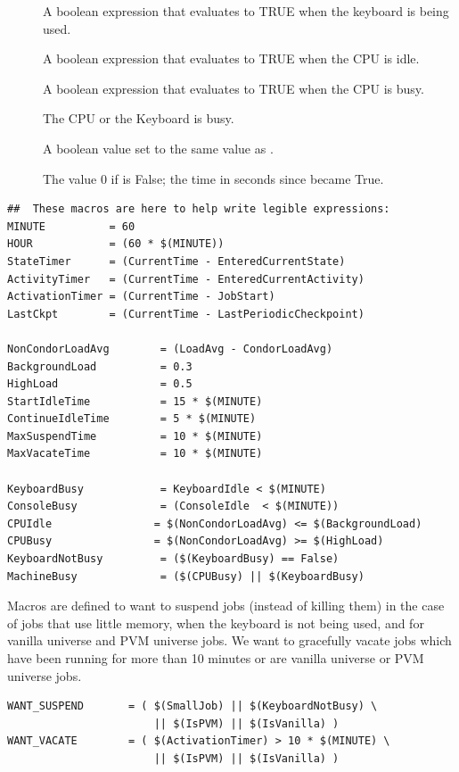 \begin{description}
\item[] A boolean expression that evaluates to TRUE
    when the keyboard is being used.

\item[] A boolean expression that evaluates to TRUE
    when the CPU is idle.

\item[] A boolean expression that evaluates
    to TRUE when the CPU is busy.

\item[] The CPU or the Keyboard is busy.

\item[] A boolean value set to the same value as 
    .

\item[] The value 0 if 
    is False; the time in seconds since
     became True.
    
\end{description}

\begin{verbatim}
##  These macros are here to help write legible expressions:
MINUTE          = 60
HOUR            = (60 * $(MINUTE))
StateTimer      = (CurrentTime - EnteredCurrentState)
ActivityTimer   = (CurrentTime - EnteredCurrentActivity)
ActivationTimer = (CurrentTime - JobStart)
LastCkpt        = (CurrentTime - LastPeriodicCheckpoint)

NonCondorLoadAvg        = (LoadAvg - CondorLoadAvg)
BackgroundLoad          = 0.3
HighLoad                = 0.5
StartIdleTime           = 15 * $(MINUTE)
ContinueIdleTime        = 5 * $(MINUTE)
MaxSuspendTime          = 10 * $(MINUTE)
MaxVacateTime           = 10 * $(MINUTE)

KeyboardBusy            = KeyboardIdle < $(MINUTE)
ConsoleBusy             = (ConsoleIdle  < $(MINUTE))
CPUIdle                = $(NonCondorLoadAvg) <= $(BackgroundLoad)
CPUBusy                = $(NonCondorLoadAvg) >= $(HighLoad)
KeyboardNotBusy         = ($(KeyboardBusy) == False)
MachineBusy             = ($(CPUBusy) || $(KeyboardBusy)
\end{verbatim}

Macros are defined to want to suspend jobs (instead of
killing them) in the case of jobs that use little memory,
when the keyboard is not being used, and for vanilla universe
and PVM universe jobs.
We want to gracefully vacate jobs which
have been running for more than 10 minutes
or are vanilla universe or PVM universe jobs.
\begin{verbatim}
WANT_SUSPEND       = ( $(SmallJob) || $(KeyboardNotBusy) \
                       || $(IsPVM) || $(IsVanilla) )
WANT_VACATE        = ( $(ActivationTimer) > 10 * $(MINUTE) \
                       || $(IsPVM) || $(IsVanilla) )
\end{verbatim}

